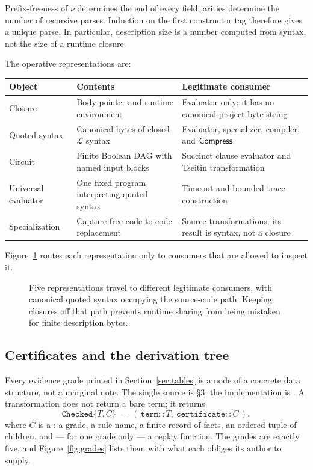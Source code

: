 Prefix-freeness of \(\nu\) determines the end of every field; arities determine
the number of recursive parses.  Induction on the first constructor tag
therefore gives a unique parse.  In particular, description size is a number
computed from syntax, not the size of a runtime closure.

The operative representations are:
\begin{center}
\begin{tabular}{P{0.19\textwidth}P{0.34\textwidth}P{0.35\textwidth}}
\toprule
Object & Contents & Legitimate consumer \\
\midrule
Closure & Body pointer and runtime environment & Evaluator only; it has no
canonical project byte string \\
Quoted syntax & Canonical bytes of closed \(\mathcal L\) syntax & Evaluator,
specializer, compiler, and \(\mathsf{Compress}\) \\
Circuit & Finite Boolean DAG with named input blocks & Succinct clause
evaluator and Tseitin transformation \\
Universal evaluator & One fixed program interpreting quoted syntax & Timeout
and bounded-trace construction \\
Specialization & Capture-free code-to-code replacement & Source
transformations; its result is syntax, not a closure \\
\bottomrule
\end{tabular}
\end{center}

Figure~\ref{fig:representations} routes each representation only to consumers
that are allowed to inspect it.
\begin{figure}[t]
\centering

\caption{Five representations travel to different legitimate consumers, with canonical quoted syntax occupying the source-code path.  Keeping closures off that path prevents runtime sharing from being mistaken for finite description bytes.}
\label{fig:representations}
\end{figure}

\subsection{Certificates and the derivation tree}
\label{sec:certificates}

Every evidence grade printed in Section~\ref{sec:tables} is a node of a
concrete data structure, not a marginal note.  The single source is
 \S3; the implementation is
.  A transformation does not return a bare term; it
returns
\[
 \mathtt{Checked}\{T,C\}
 \;=\;
 (\,\mathtt{term}::T,\ \mathtt{certificate}::C\,),
\]
where \(C\) is a : a grade, a rule name, a finite record of
facts, an ordered tuple of children, and --- for one grade only --- a replay
function.  The grades are exactly five, and Figure~\ref{fig:grades} lists
them with what each obliges its author to supply.

